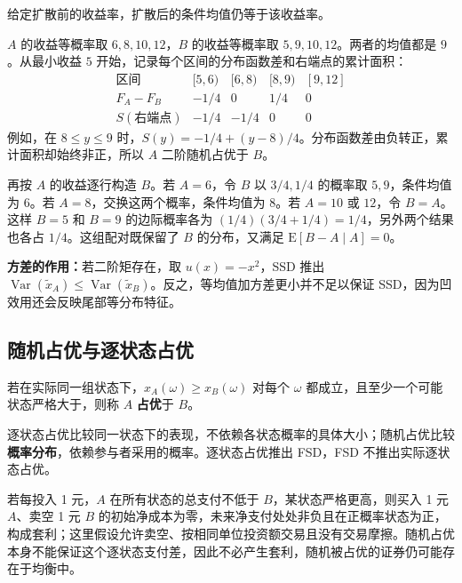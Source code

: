 给定扩散前的收益率，扩散后的条件均值仍等于该收益率。

\begin{tcolorbox}[example,title={课堂例题：从累计面积构造均值保持扩散}]
$A$ 的收益等概率取 $6,8,10,12$，$B$ 的收益等概率取 $5,9,10,12$。两者的均值都是 $9$。从最小收益 $5$ 开始，记录每个区间的分布函数差和右端点的累计面积：
\[
\begin{array}{c|cccc}
\text{区间} &[5,6) &[6,8) &[8,9) &[9,12]\\ \hline
F_A-F_B &-1/4 &0 &1/4 &0\\
S(\text{右端点}) &-1/4 &-1/4 &0 &0
\end{array}
\]
例如，在 $8\le y\le9$ 时，$S(y)=-1/4+(y-8)/4$。分布函数差由负转正，累计面积却始终非正，所以 $A$ 二阶随机占优于 $B$。

再按 $A$ 的收益逐行构造 $B$。若 $A=6$，令 $B$ 以 $3/4,1/4$ 的概率取 $5,9$，条件均值为 $6$。若 $A=8$，交换这两个概率，条件均值为 $8$。若 $A=10$ 或 $12$，令 $B=A$。这样 $B=5$ 和 $B=9$ 的边际概率各为 $(1/4)(3/4+1/4)=1/4$，另外两个结果也各占 $1/4$。这组配对既保留了 $B$ 的分布，又满足 $\mathrm E[B-A\mid A]=0$。
\end{tcolorbox}

\textbf{方差的作用：}若二阶矩存在，取 $u(x)=-x^2$，SSD 推出
$\operatorname{Var}(\tilde x_A)\le\operatorname{Var}(\tilde x_B)$。反之，等均值加方差更小并不足以保证 SSD，因为凹效用还会反映尾部等分布特征。

\subsection{随机占优与逐状态占优}
\begin{tcolorbox}[knowledge]
 若在实际同一组状态下，$x_A(\omega)\ge x_B(\omega)$ 对每个 $\omega$ 都成立，且至少一个可能状态严格大于，则称 $A$ \textbf{占优}于 $B$。
\end{tcolorbox}
逐状态占优比较同一状态下的表现，不依赖各状态概率的具体大小；随机占优比较\textbf{概率分布}，依赖参与者采用的概率。逐状态占优推出 FSD，FSD 不推出实际逐状态占优。

若每投入 1 元，$A$ 在所有状态的总支付不低于 $B$，某状态严格更高，则买入 1 元 $A$、卖空 1 元 $B$ 的初始净成本为零，未来净支付处处非负且在正概率状态为正，构成套利；这里假设允许卖空、按相同单位投资额交易且没有交易摩擦。随机占优本身不能保证这个逐状态支付差，因此不必产生套利，随机被占优的证券仍可能存在于均衡中。

